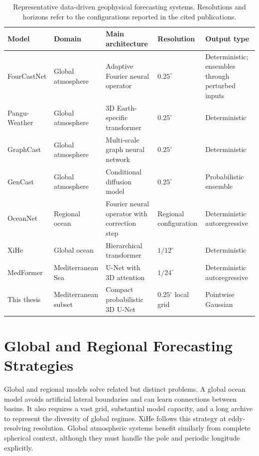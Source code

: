 \begin{table}[htbp]
\centering
\small
\caption{Representative data-driven geophysical forecasting systems. Resolutions and horizons refer to the configurations reported in the cited publications.}
\label{tab:state-of-art-models}
\begin{tabular}{p{2.2cm}p{2.2cm}p{3.1cm}p{2.1cm}p{2.2cm}}
\toprule
Model & Domain & Main architecture & Resolution & Output type \\
\midrule
FourCastNet & Global atmosphere & Adaptive Fourier neural operator & $0.25^{\circ}$ & Deterministic; ensembles through perturbed inputs \\
Pangu-Weather & Global atmosphere & 3D Earth-specific transformer & $0.25^{\circ}$ & Deterministic \\
GraphCast & Global atmosphere & Multi-scale graph neural network & $0.25^{\circ}$ & Deterministic \\
GenCast & Global atmosphere & Conditional diffusion model & $0.25^{\circ}$ & Probabilistic ensemble \\
OceanNet & Regional ocean & Fourier neural operator with correction step & Regional configuration & Deterministic autoregressive \\
XiHe & Global ocean & Hierarchical transformer & $1/12^{\circ}$ & Deterministic \\
MedFormer & Mediterranean Sea & U-Net with 3D attention & $1/24^{\circ}$ & Deterministic autoregressive \\
This thesis & Mediterranean subset & Compact probabilistic 3D U-Net & $0.25^{\circ}$ local grid & Pointwise Gaussian \\
\bottomrule
\end{tabular}
\end{table}

\section{Global and Regional Forecasting Strategies}

Global and regional models solve related but distinct problems. A global ocean model avoids artificial lateral boundaries and can learn connections between basins. It also requires a vast grid, substantial model capacity, and a long archive to represent the diversity of global regimes. XiHe follows this strategy at eddy-resolving resolution. Global atmospheric systems benefit similarly from complete spherical context, although they must handle the pole and periodic longitude explicitly.

